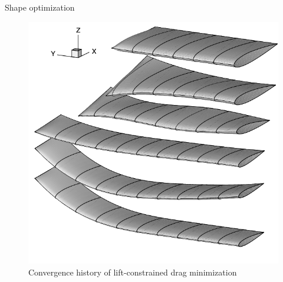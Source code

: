 \documentclass[t,12pt]{beamer}
\begin{document}
\begin{frame}{Shape optimization}
	\begin{figure}
		\includegraphics[scale=0.2]{ppt-illus-shapeoptimization}
		\caption{Convergence history of lift-constrained drag minimization }
	\end{figure}
\end{frame}
\end{document}
